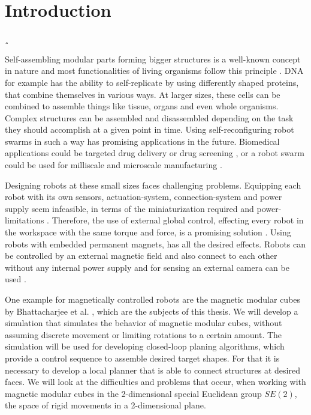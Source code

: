 \chapter{Introduction}
\label{chap:intro}¸

Self-assembling modular parts forming bigger structures is a well-known concept in nature and most functionalities of living organisms follow this principle \cite{bishop2005}.
DNA for example has the ability to self-replicate by using differently shaped proteins, that combine themselves in various ways.
At larger sizes, these cells can be combined to assemble things like tissue, organs and even whole organisms.
Complex structures can be assembled and disassembled depending on the task they should accomplish at a given point in time. 
Using self-reconfiguring robot swarms in such a way has promising applications in the future.
Biomedical applications could be targeted drug delivery or drug screening \cite{sitti2015}, or a robot swarm could be used for milliscale and microscale manufacturing \cite{pelrine2016}.

Designing robots at these small sizes faces challenging problems.
Equipping each robot with its own sensors, actuation-system, connection-system and power supply seem infeasible, in terms of the miniaturization required and power-limitations \cite{white2007}.
Therefore, the use of external global control, effecting every robot in the workspace with the same torque and force, is a promising solution \cite{white2007}.
Using robots with embedded permanent magnets, has all the desired effects.
Robots can be controlled by an external magnetic field and also connect to each other without any internal power supply and for sensing an external camera can be used \cite{saab2019}.

One example for magnetically controlled robots are the magnetic modular cubes by Bhattacharjee et al. \cite{Bhattacharjee2022}, which are the subjects of this thesis.
We will develop a simulation that simulates the behavior of magnetic modular cubes, without assuming discrete movement or limiting rotations to a certain amount.
The simulation will be used for developing closed-loop planing algorithms, which provide a control sequence to assemble desired target shapes.
For that it is necessary to develop a local planner that is able to connect structures at desired faces.
We will look at the difficulties and problems that occur, when working with magnetic modular cubes in the 2-dimensional special Euclidean group \(SE(2)\), the space of rigid movements in a 2-dimensional plane.


